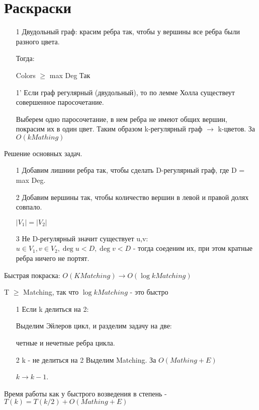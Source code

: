 \section{Раскраски}


\begin{itemize}

\item[1] 
Двудольный граф: красим ребра так, чтобы у вершины все ребра были разного цвета.

 Тогда:

Colors $\ge$ max Deg Так 
\item[1'] 
Если граф регулярный (двудольный), то по лемме Холла существеут совершенное паросочетание.

Выберем одно паросочетание, в нем ребра не имеют общих вершин, покрасим их в один цвет. Таким образом k-регулярный граф $\to$ k-цветов. За $O(k Mathing)$
\end{itemize}


Решение основных задач.
\begin{itemize}
\item[1] 
Добавим лишнии ребра так, чтобы сделать D-регулярный граф, где D = max Deg.
\item[2] 
Добавим вершины так, чтобы количество вершин в левой и правой долях совпало.

$|V_1| = |V_2|$
\item[3]
Не D-регулярный значит существует u,v: $u \in V_1, v \in V_2, \deg u < D, \deg v < D$ - тогда соеденим их, при этом кратные ребра ничего не портят.
\end{itemize}

Быстрая покраска: $O(K Matching) \to O(\log{k} Matching)$
\begin{Rem}
T $\ge$ Matching, так что $\log{k} Matching$ - это быстро
\end{Rem}

\begin{itemize}
\item[1] 
Если k делиться на 2:

Выделим Эйлеров цикл, и разделим задачу на две:

четные и нечетные ребра цикла.
\item[2] 
k - не делиться на 2
Выделим Matching. За $O(Mathing + E)$

$k \to k-1$.
\end{itemize}

Время работы как у быстрого возведения в степень - $T(k) = T(k/2) + O(Mathing + E)$
 

